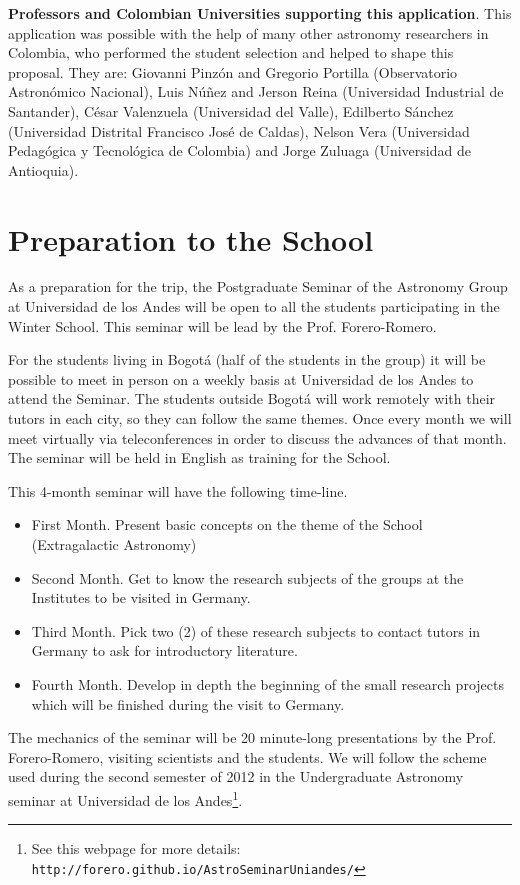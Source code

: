 \documentclass[12pt]{article}
\begin{document}
{\bf Professors and Colombian Universities supporting this application}. This application was
possible with the help of many other astronomy researchers in
Colombia, who performed the student selection and helped to shape this
proposal. They are: Giovanni Pinz\'on and Gregorio
Portilla (Observatorio Astron\'omico Nacional), Luis N\'u\~nez and
Jerson Reina (Universidad Industrial de Santander), C\'esar Valenzuela
(Universidad del Valle), Edilberto S\'anchez (Universidad Distrital
Francisco Jos\'e de Caldas), Nelson Vera (Universidad Pedag\'ogica y Tecnol\'ogica de
Colombia) and Jorge Zuluaga (Universidad de Antioquia). 


\section{Preparation to the School}
\label{sec:preparation}

As a preparation for the trip, the Postgraduate Seminar of the Astronomy
Group at Universidad de los Andes will be open to all the students participating in the
Winter School. This seminar will be lead by the Prof. Forero-Romero. 

For the students living in Bogot\'a (half of the students in the group)
it will be possible to meet in person on a weekly basis at Universidad
de los Andes to attend the Seminar. The students outside Bogot\'a
will work remotely with their tutors in each city, so they can follow the same
themes. Once every month we will meet virtually via teleconferences in
order to discuss the advances of that month. The seminar
will be held in English as training for the School. 

This 4-month seminar will have the following time-line.
\begin{itemize}
\item First Month. Present basic concepts on the theme of the School
  (Extragalactic Astronomy)
\item Second Month. Get to know the research subjects of the groups at
  the Institutes to be visited in Germany.
\item Third Month. Pick two (2) of these research subjects to contact
  tutors in Germany to ask for introductory literature.
\item Fourth Month. Develop in depth the beginning of the small
  research projects which will be finished during the visit to Germany. 
\end{itemize}

The mechanics of the seminar will be 20 minute-long presentations by the
Prof. Forero-Romero, visiting scientists and the students. We will follow the
scheme used during the second semester of 2012 in the Undergraduate
Astronomy seminar at Universidad de los Andes\footnote{See this
  webpage for more details:
  \verb"http://forero.github.io/AstroSeminarUniandes/"}. 
\end{document}
